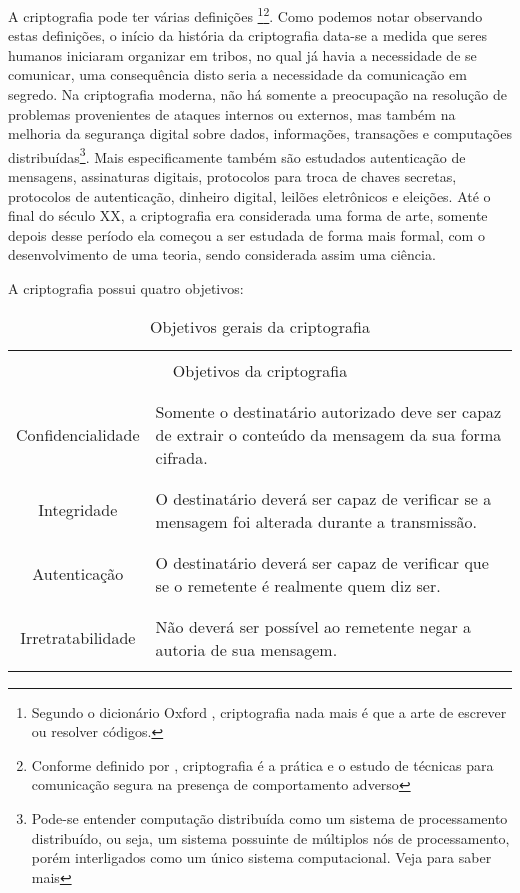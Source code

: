   A criptografia  pode ter várias definições \footnote{Segundo o dicionário Oxford \cite{OXDIC}, criptografia nada mais é que a arte de escrever ou resolver códigos.}\footnote{Conforme definido por \cite{RIVEST}, criptografia é a prática e o estudo de técnicas para comunicação segura na presença de comportamento adverso}. Como podemos notar observando estas definições, o início da história da criptografia data-se a medida que seres humanos iniciaram organizar em tribos, no qual já havia a necessidade de se comunicar, uma consequência disto seria a necessidade da comunicação em segredo. Na criptografia moderna, não há somente a preocupação na resolução de problemas provenientes de ataques internos ou externos, mas também na melhoria da segurança digital sobre dados, informações, transações e computações distribuídas\footnote{Pode-se entender computação distribuída como um sistema de processamento distribuído, ou seja, um sistema possuinte de múltiplos nós de processamento, porém interligados como um único sistema computacional. Veja \cite{PROG2} para saber mais}. Mais especificamente também são estudados autenticação de mensagens, assinaturas digitais, protocolos para troca de chaves secretas, protocolos de autenticação, dinheiro digital, leilões eletrônicos e eleições.  Até o final do século XX, a criptografia era considerada uma forma de arte, somente depois desse período ela começou a ser estudada de forma mais formal, com o desenvolvimento de uma teoria, sendo considerada assim uma ciência.
  
  
  A criptografia possui quatro objetivos:
  \begin{table}[H]
  \centering
  \begin{tabular}{|c|p{12cm}|}
  	\hline
  	\multicolumn{2}{|c|}{}\\
  	\multicolumn{2}{|c|}{Objetivos da criptografia} \\
  	\multicolumn{2}{|c|}{}\\
  	\hline
  	&\\
  	Confidencialidade & Somente o destinatário autorizado deve ser capaz de extrair o conteúdo da mensagem da sua forma cifrada. \\
  	&\\
  	\hline
  	&\\
  	Integridade & O destinatário deverá ser capaz de verificar se a mensagem foi alterada durante a transmissão. \\
  	&\\
  	\hline
  	&\\
  	Autenticação & O destinatário deverá ser capaz de verificar que se o remetente é realmente quem diz ser. \\
  	&\\
  	\hline
  	&\\
  	Irretratabilidade & Não deverá ser possível ao remetente negar a autoria de sua mensagem. \\
  	&\\
  	\hline
  \end{tabular}
\caption{Objetivos gerais da criptografia}
\end{table}
  
